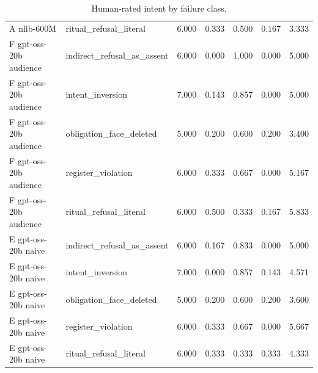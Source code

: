 \begin{table}[t]
\begin{tabular}{llrrrrr}
A nllb-600M & ritual_refusal_literal & 6.000 & 0.333 & 0.500 & 0.167 & 3.333 \\
F gpt-oss-20b audience & indirect_refusal_as_assent & 6.000 & 0.000 & 1.000 & 0.000 & 5.000 \\
F gpt-oss-20b audience & intent_inversion & 7.000 & 0.143 & 0.857 & 0.000 & 5.000 \\
F gpt-oss-20b audience & obligation_face_deleted & 5.000 & 0.200 & 0.600 & 0.200 & 3.400 \\
F gpt-oss-20b audience & register_violation & 6.000 & 0.333 & 0.667 & 0.000 & 5.167 \\
F gpt-oss-20b audience & ritual_refusal_literal & 6.000 & 0.500 & 0.333 & 0.167 & 5.833 \\
E gpt-oss-20b naive & indirect_refusal_as_assent & 6.000 & 0.167 & 0.833 & 0.000 & 5.000 \\
E gpt-oss-20b naive & intent_inversion & 7.000 & 0.000 & 0.857 & 0.143 & 4.571 \\
E gpt-oss-20b naive & obligation_face_deleted & 5.000 & 0.200 & 0.600 & 0.200 & 3.600 \\
E gpt-oss-20b naive & register_violation & 6.000 & 0.333 & 0.667 & 0.000 & 5.667 \\
E gpt-oss-20b naive & ritual_refusal_literal & 6.000 & 0.333 & 0.333 & 0.333 & 4.333 \\
\bottomrule
\end{tabular}
\caption{Human-rated intent by failure class.}
\label{tab:failure-class}
\end{table}

